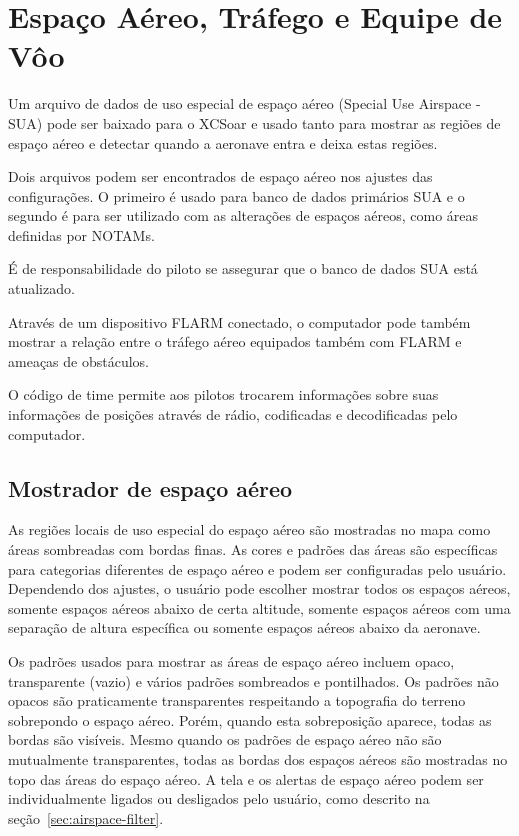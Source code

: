 \chapter{Espaço Aéreo, Tráfego e Equipe de Vôo}\label{cha:airspace}
Um arquivo de dados de uso especial de espaço aéreo (Special Use Airspace - SUA) pode ser baixado para o XCSoar e usado tanto para mostrar as regiões de espaço aéreo e detectar quando a aeronave entra e deixa estas regiões.

Dois arquivos podem ser encontrados de espaço aéreo nos ajustes das configurações.  O primeiro é usado para banco de dados primários SUA e o segundo é para ser utilizado com as alterações de espaços aéreos, como áreas definidas por NOTAMs.

É de responsabilidade do piloto se assegurar que o banco de dados SUA está atualizado.

Através de um dispositivo FLARM conectado, o computador pode também mostrar a relação entre o tráfego aéreo equipados também com FLARM e ameaças de obstáculos.

O código de time permite aos pilotos trocarem informações sobre suas informações de posições através de rádio, codificadas e decodificadas pelo computador.


\section{Mostrador de espaço aéreo}

As regiões locais de uso especial do espaço aéreo são mostradas no mapa como áreas sombreadas com bordas finas.  As cores e padrões das áreas são específicas para categorias diferentes de espaço aéreo e podem ser configuradas pelo usuário.  Dependendo dos ajustes, o usuário pode escolher mostrar todos os espaços aéreos, somente espaços aéreos abaixo de certa altitude, somente espaços aéreos com uma separação de altura específica ou somente espaços aéreos abaixo da aeronave.

Os padrões usados para mostrar as áreas de espaço aéreo incluem opaco, transparente (vazio) e vários padrões sombreados e pontilhados.  Os padrões não opacos são praticamente transparentes respeitando a topografia do terreno sobrepondo o espaço aéreo.  Porém, quando esta sobreposição aparece, todas as bordas são visíveis.  Mesmo quando os padrões de espaço aéreo não são mutualmente transparentes, todas as bordas dos espaços aéreos são mostradas no topo das áreas do espaço aéreo.
A tela e os alertas de espaço aéreo podem ser individualmente ligados ou desligados pelo usuário, como descrito na seção~\ref{sec:airspace-filter}.

